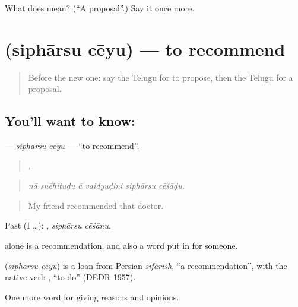 \begin{tcolorbox}[breakable,colback=teal!4,colframe=teal!35!black,title={Before you move on}]
What does  mean? (\textquotedblleft{}A proposal\textquotedblright{}.) Say it once more.
\end{tcolorbox}
\section[\texorpdfstring{\te{సిఫార్సు} \te{చేయు} (siphārsu cēyu)}{సిఫార్సు చేయు (siphārsu cēyu)}]{  (siphārsu cēyu) — to recommend}

\label{lesson:TE-C384-sipharsu-ceyu}



\begin{quote}
Before the new one: say the Telugu for to propose, then the Telugu for a proposal.
\end{quote}

\subsection*{You'll want to know:  }
\textbf{ } — \emph{siphārsu cēyu} — \textquotedblleft{}to recommend\textquotedblright{}.

\begin{quote}
     .
\end{quote}

\begin{quote}
\emph{nā snēhituḍu ā vaidyuḍini siphārsu cēśāḍu.}
\end{quote}

\begin{quote}
My friend recommended that doctor.
\end{quote}

Past (I …):  , \emph{siphārsu cēśānu}.

 alone is a recommendation, and also a word put in for someone.

\begin{cousinweb}
\textbf{ } (\emph{siphārsu cēyu}) is a loan from Persian \emph{sifārish}, \textquotedblleft{}a recommendation\textquotedblright{}, with the native verb , \textquotedblleft{}to do\textquotedblright{} (DEDR 1957).
\end{cousinweb}

\begin{grammarlens}[title={What you've built}]
One more word for giving reasons and opinions.
\end{grammarlens}

